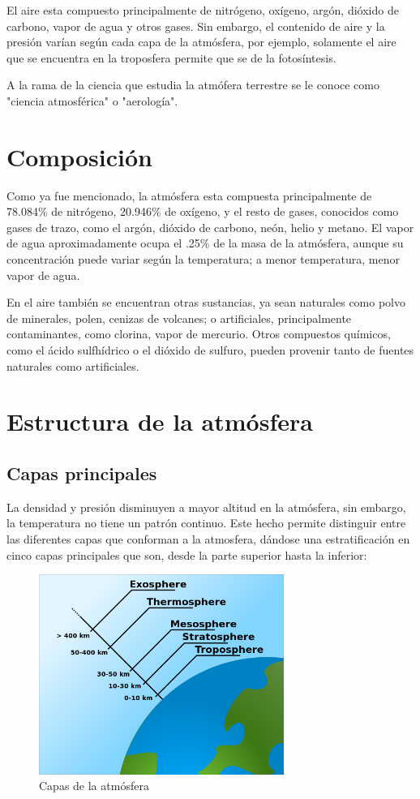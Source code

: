 \documentclass{article}
\begin{document}
El aire esta compuesto principalmente de nitrógeno, oxígeno, argón, dióxido de carbono, vapor de agua y otros gases. Sin embargo, el contenido de aire y la presión varían según cada capa de la atmósfera, por ejemplo, solamente el aire que se encuentra en la troposfera permite que se de la fotosíntesis.

A la rama de la ciencia que estudia la atmófera terrestre se le conoce como "ciencia atmosférica" o "aerología".



\section{Composición}


Como ya fue mencionado, la atmósfera esta compuesta principalmente de 78.084\% de nitrógeno, 20.946\% de oxígeno, y el resto de gases, conocidos como gases de trazo, como el argón, dióxido de carbono, neón, helio y metano. El vapor de agua aproximadamente ocupa el .25\% de la masa de la atmósfera, aunque su concentración puede variar según la temperatura; a menor temperatura, menor vapor de agua.

En el aire también se encuentran otras sustancias, ya sean naturales como polvo de minerales, polen, cenizas de volcanes; o artificiales, principalmente contaminantes, como clorina, vapor de mercurio. Otros compuestos químicos, como el ácido sulfhídrico o el dióxido de sulfuro, pueden provenir tanto de fuentes naturales como artificiales.

 

\section{Estructura de la atmósfera}


\subsection {Capas principales}

La densidad y presión disminuyen a mayor altitud en la atmósfera, sin embargo, la temperatura no tiene un patrón continuo. Este hecho permite distinguir entre las diferentes capas que conforman a la atmosfera, dándose una estratificación en cinco capas principales que son, desde la parte superior hasta la inferior:

\begin{figure}[h!]
  \includegraphics[width=8cm]{2.png}
  \centering
  \caption{Capas de la atmósfera}
  \label{fig:2}
\end{figure}
\end{document}
